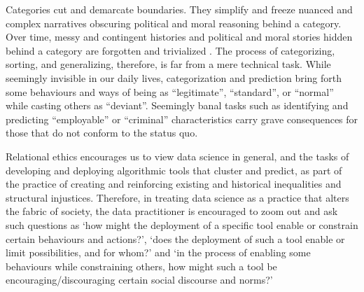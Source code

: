 Categories cut and demarcate boundaries. They simplify and freeze nuanced and complex narratives obscuring political and moral reasoning behind a category. Over time, messy and contingent histories and political and moral stories hidden behind a category are forgotten and trivialized \cite{star2007enacting}. The process of categorizing, sorting, and generalizing, therefore, is far from a mere technical task. While seemingly invisible in our daily lives, categorization and prediction bring forth some behaviours and ways of being  as ``legitimate'', ``standard'', or ``normal'' while casting others as ``deviant''\cite{star2007enacting}. Seemingly banal tasks such as identifying and predicting ``employable'' or ``criminal'' characteristics carry grave consequences for those that do not conform to the status quo. 

Relational ethics encourages us to view data science in general, and the tasks of developing and deploying algorithmic tools that cluster and predict, as part of the practice of creating and reinforcing existing and historical inequalities and structural injustices. Therefore, in treating data science as a practice that alters the fabric of society, the data practitioner is encouraged to zoom out and ask such questions as `how might the deployment of a specific tool enable or constrain certain behaviours and actions?', `does the deployment of such a tool enable or limit possibilities, and for whom?' and `in the process of enabling some behaviours while constraining others, how might such a tool be encouraging/discouraging certain social discourse and norms?'


